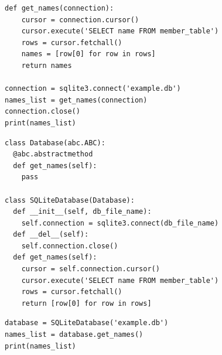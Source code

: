 \documentclass[calcdimensions,landscape,letterpaper]{powersem}
\newcommand{\thecurrentheading}{}
\newcommand{\heading}[1]{\renewcommand{\thecurrentheading}{#1}}
\begin{document}
\begin{slide}
  \heading{Dependency Inversion - Before}
  \begin{center}
    \begin{verbatim}
def get_names(connection):
    cursor = connection.cursor()
    cursor.execute('SELECT name FROM member_table')
    rows = cursor.fetchall()
    names = [row[0] for row in rows]
    return names

connection = sqlite3.connect('example.db')
names_list = get_names(connection)
connection.close()
print(names_list)
    \end{verbatim}
  \end{center}
\end{slide}

\begin{slide}
  \heading{Dependency Inversion - After}
  \begin{center}
    \begin{verbatim}
class Database(abc.ABC):
  @abc.abstractmethod
  def get_names(self):
    pass

class SQLiteDatabase(Database):
  def __init__(self, db_file_name):
    self.connection = sqlite3.connect(db_file_name)
  def __del__(self):
    self.connection.close()
  def get_names(self):
    cursor = self.connection.cursor()
    cursor.execute('SELECT name FROM member_table')
    rows = cursor.fetchall()
    return [row[0] for row in rows]
    \end{verbatim}
  \end{center}
\end{slide}

\begin{slide}
  \heading{Dependency Inversion - After}
  \begin{center}
    \begin{verbatim}
database = SQLiteDatabase('example.db')
names_list = database.get_names()
print(names_list)
    \end{verbatim}
  \end{center}
\end{slide}

\begin{slide}
  \heading{SOLID Overview}
  \begin{center}
  \end{center}
\end{slide}
\end{document}
